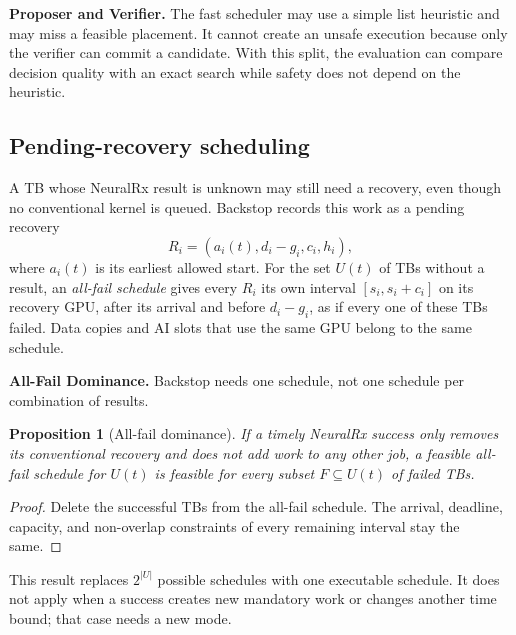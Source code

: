\documentclass[acmsmall,screen,review,anonymous]{acmart}
\newcommand{\sys}{Backstop\xspace}
\newcommand{\NRx}{NeuralRx\xspace}
\newtheorem{proposition}{Proposition}
\begin{document}
\noindent\textbf{Proposer and Verifier.}
The fast scheduler may use a simple list heuristic and may miss a feasible placement. It cannot create an
unsafe execution because only the verifier can commit a candidate. With this split, the evaluation can
compare decision quality with an exact search while safety does not depend on the heuristic.

\subsection{Pending-recovery scheduling}
\label{sec:design-recovery}

A TB whose \NRx result is unknown may still need a recovery, even though no conventional kernel is
queued. \sys records this work as a pending recovery
\begin{equation}
 R_i=(a_i(t),d_i-g_i,c_i,h_i),
\end{equation}
where $a_i(t)$ is its earliest allowed start. For the set $U(t)$ of TBs without a result, an
\emph{all-fail schedule} gives every $R_i$ its own interval $[s_i,s_i+c_i]$ on its recovery GPU, after
its arrival and before $d_i-g_i$, as if every one of these TBs failed. Data copies and AI slots that use
the same GPU belong to the same schedule.

\noindent\textbf{All-Fail Dominance.}
\sys needs one schedule, not one schedule per combination of results.
\begin{proposition}[All-fail dominance]
If a timely \NRx success only removes its conventional recovery and does not add work to any other job,
a feasible all-fail schedule for $U(t)$ is feasible for every subset $F\subseteq U(t)$ of failed TBs.
\end{proposition}
\begin{proof}
Delete the successful TBs from the all-fail schedule. The arrival, deadline, capacity, and non-overlap
constraints of every remaining interval stay the same.
\end{proof}
This result replaces $2^{|U|}$ possible schedules with one executable schedule. It does not apply when a
success creates new mandatory work or changes another time bound; that case needs a new mode.
\end{document}
